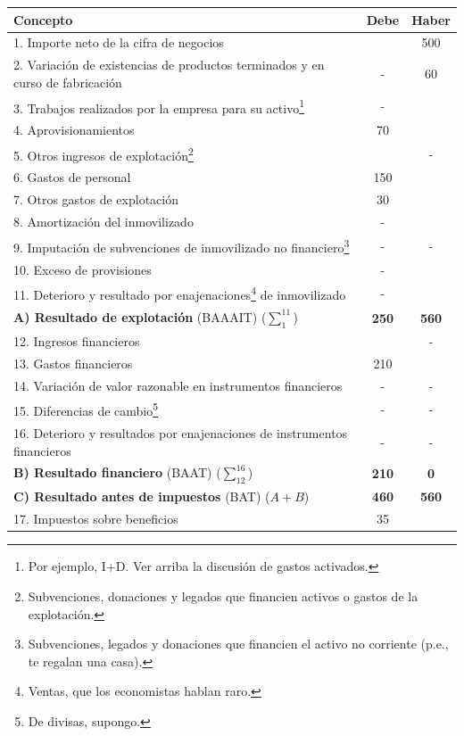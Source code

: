 \documentclass[nochap,palatino,notitlepage]{apuntes}
\begin{document}
\begin{table}[hbtp]
\centering
\begin{minipage}{\textwidth}
\footnotesize
\begin{tabular}{l|c|c}
\textbf{Concepto} & \textbf{Debe} & \textbf{Haber} \\ \toprule
1. Importe neto de la cifra de negocios & & 500 \\
2. Variación de existencias de productos terminados y en curso de fabricación & - & 60 \\
3. Trabajos realizados por la empresa para su activo\footnote{Por ejemplo, I+D. Ver arriba la discusión de gastos activados.} & - & \\
4. Aprovisionamientos & 70 &  \\
5. Otros ingresos de explotación\footnote{Subvenciones, donaciones y legados que financien activos o gastos de la explotación.} & & - \\
6. Gastos de personal & 150 & \\
7. Otros gastos de explotación & 30 & \\
8. Amortización del inmovilizado & - & \\
9. Imputación de subvenciones de inmovilizado no financiero\footnote{Subvenciones, legados y donaciones que financien el activo no corriente (p.e., te regalan una casa).} & - & - \\
10. Exceso de provisiones & - & \\
11. Deterioro y resultado por enajenaciones\footnote{Ventas, que los economistas hablan raro.} de inmovilizado & - & \\ \midrule
\textbf{A) Resultado de explotación} (BAAAIT) ($\sum_1^{11}$) & \textbf{250} & \textbf{560} \\ \midrule
12. Ingresos financieros & & - \\
13. Gastos financieros & 210 & \\
14. Variación de valor razonable en instrumentos financieros & - & - \\
15. Diferencias de cambio\footnote{De divisas, supongo.} & - & - \\
16. Deterioro y resultados por enajenaciones de instrumentos financieros & - & - \\ \midrule
\textbf{B) Resultado financiero} (BAAT) ($\sum_{12}^{16}$) & \textbf{210} & \textbf{0} \\ \midrule
\textbf{C) Resultado antes de impuestos} (BAT) ($A + B$) & \textbf{460} & \textbf{560} \\ \midrule
17. Impuestos sobre beneficios & 35 & \\ \midrule

\end{tabular}
\end{minipage}
\end{table}
\end{document}
